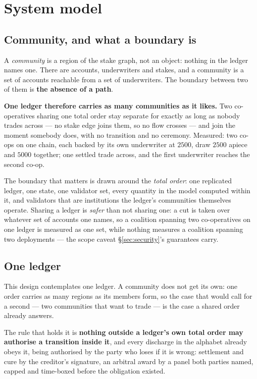 \section{System model}
\label{sec:model}

\subsection{Community, and what a boundary is}

A \emph{community} is a region of the stake graph, not an object: nothing in the ledger
names one. There are accounts, underwriters and stakes, and a community is a set of
accounts reachable from a set of underwriters. The boundary between two of them is
\textbf{the absence of a path}.

\textbf{One ledger therefore carries as many communities as it likes.} Two co-operatives
sharing one total order stay separate for exactly as long as nobody trades across --- no
stake edge joins them, so no flow crosses --- and join the moment somebody does, with no
transition and no ceremony. Measured: two co-ops on one chain, each backed by its own
underwriter at $2500$, draw $2500$ apiece and $5000$ together; one settled trade across,
and the first underwriter reaches the second co-op.

The boundary that matters is drawn around the \emph{total order}: one replicated ledger,
one state, one validator set, every quantity in the model computed within it, and
validators that are institutions the ledger's communities themselves operate. Sharing a
ledger is \emph{safer} than not sharing one: a cut is taken over whatever set of accounts
one names, so a coalition spanning two co-operatives on one ledger is measured as one set,
while nothing measures a coalition spanning two deployments --- the scope caveat
\S\ref{sec:security}'s guarantees carry.

\subsection{One ledger}
\label{sec:oneledger}

This design contemplates one ledger. A community does not get its own: one order carries
as many regions as its members form, so the case that would call for a second --- two
communities that want to trade --- is the case a shared order already answers.

The rule that holds it is \textbf{nothing outside a ledger's own total order may authorise
a transition inside it}, and every discharge in the alphabet already obeys it, being
authorised by the party who loses if it is wrong: settlement and cure by the creditor's
signature, an arbitral award by a panel both parties named, capped and time-boxed before
the obligation existed.

